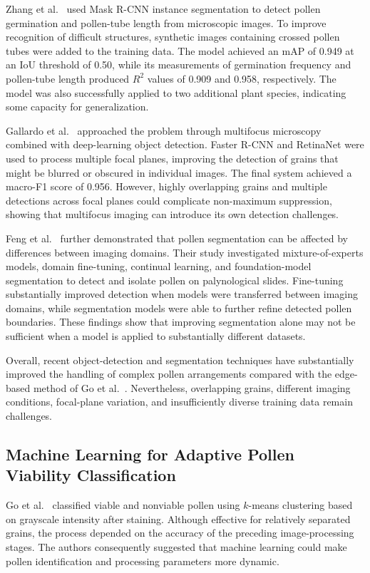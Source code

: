 Zhang et al.~\cite{zhang2023} used Mask R-CNN instance segmentation to detect pollen germination and pollen-tube length from microscopic images. To improve recognition of difficult structures, synthetic images containing crossed pollen tubes were added to the training data. The model achieved an mAP of 0.949 at an IoU threshold of 0.50, while its measurements of germination frequency and pollen-tube length produced $R^2$ values of 0.909 and 0.958, respectively. The model was also successfully applied to two additional plant species, indicating some capacity for generalization.

Gallardo et al.~\cite{gallardo2024} approached the problem through multifocus microscopy combined with deep-learning object detection. Faster R-CNN and RetinaNet were used to process multiple focal planes, improving the detection of grains that might be blurred or obscured in individual images. The final system achieved a macro-F1 score of 0.956. However, highly overlapping grains and multiple detections across focal planes could complicate non-maximum suppression, showing that multifocus imaging can introduce its own detection challenges.

Feng et al.~\cite{feng2025} further demonstrated that pollen segmentation can be affected by differences between imaging domains. Their study investigated mixture-of-experts models, domain fine-tuning, continual learning, and foundation-model segmentation to detect and isolate pollen on palynological slides. Fine-tuning substantially improved detection when models were transferred between imaging domains, while segmentation models were able to further refine detected pollen boundaries. These findings show that improving segmentation alone may not be sufficient when a model is applied to substantially different datasets.

Overall, recent object-detection and segmentation techniques have substantially improved the handling of complex pollen arrangements compared with the edge-based method of Go et al.~\cite{go2019}. Nevertheless, overlapping grains, different imaging conditions, focal-plane variation, and insufficiently diverse training data remain challenges.

\subsection{Machine Learning for Adaptive Pollen Viability Classification}
\label{sec:rw-viability}

Go et al.~\cite{go2019} classified viable and nonviable pollen using $k$-means clustering based on grayscale intensity after staining. Although effective for relatively separated grains, the process depended on the accuracy of the preceding image-processing stages. The authors consequently suggested that machine learning could make pollen identification and processing parameters more dynamic.

